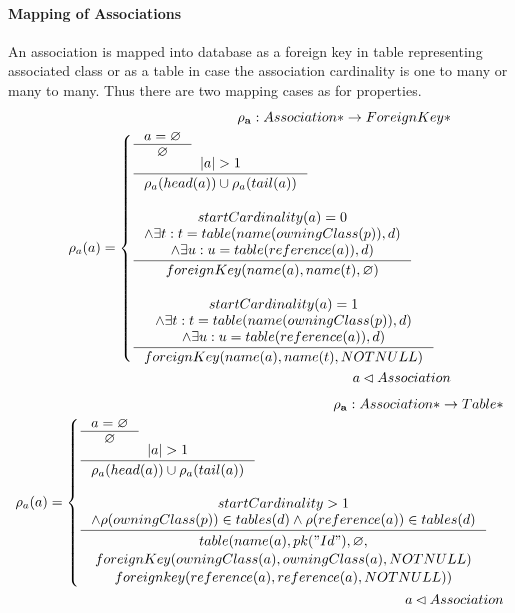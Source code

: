 \documentclass[11pt]{article}
\begin{document}
\paragraph{Mapping of Associations} An association is mapped into database as a foreign key in table representing associated class or as a table in case the association cardinality is one to many or many to many. Thus there are two mapping cases as for properties.
\begin{align*}
	\mathbf{\rho_a} : Association* \rightarrow ForeignKey* \\
	\rho_a(a) = \begin{cases}
		\inference{a = \varnothing}{\varnothing}\\
		\inference{|a| > 1}{\rho_{a}(head(a)) \cup \rho_{a}(tail(a))}\\\\
		\inference{ startCardinality(a) = 0 \\ \wedge \exists t : t = table(name(owningClass(p)), d) \\ \wedge \exists u : u = table(reference(a)), d)
		}{
			foreignKey(name(a), name(t),  \varnothing) 
	 	}
  \\ \\
 	 \inference{ startCardinality(a) = 1 \\ \wedge \exists t : t = table(name(owningClass(p)), d) \\ \wedge \exists u : u = table(reference(a)), d)
 	 }{ 
		foreignKey(name(a), name(t),  NOTNULL)
	}
	 \end{cases}\\
	 a \lhd Association
\end{align*}
\begin{align*} 
	\mathbf{\rho_a} : Association* \rightarrow Table* \\
	\rho_a(a) = \begin{cases}
 		\inference{a = \varnothing}{\varnothing}\\
		\inference{|a| > 1}{\rho_{a}(head(a)) \cup \rho_{a}(tail(a))}\\\\
		\inference{  startCardinality > 1 \\ \wedge \rho(owningClass(p)) \in tables(d) \wedge \rho(reference(a)) \in tables(d)
  		}{\begin{gathered}  
		 table(name(a), pk("Id"), \varnothing, \\ foreignKey(owningClass(a),owningClass(a), NOTNULL) \\ foreignkey(reference(a), reference(a), NOTNULL)) 
  		\end{gathered}}  
 	\end{cases}\\
	 a \lhd Association
\end{align*}
\end{document}
